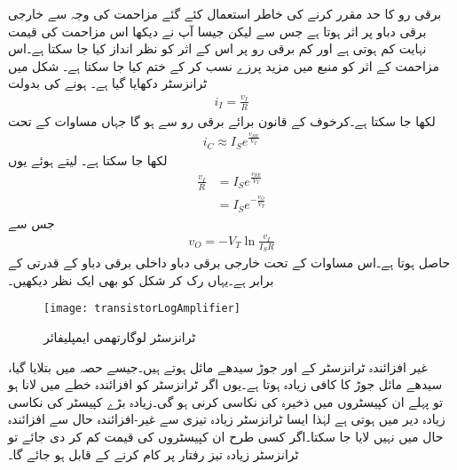 برقی رو کا حد مقرر کرنے کی خاطر استعمال کئے گئے مزاحمت  کی وجہ سے خارجی برقی دباو   پر اثر ہوتا ہے جس سے  لیکن جیسا آپ نے دیکھا اس مزاحمت کی قیمت نہایت کم ہوتی ہے اور کم برقی رو پر اس کے اثر کو نظر انداز کیا جا سکتا ہے۔اس مزاحمت کے اثر کو منبع میں مزید پرزے نسب کر کے ختم کیا جا سکتا ہے۔
شکل  میں ٹرانزسٹر  دکھایا گیا ہے۔ ہونے کی بدولت
\begin{align*}
i_I=\frac{v_I}{R}
\end{align*}
لکھا جا سکتا ہے۔کرخوف کے قانون برائے برقی رو سے  ہو گا جہاں مساوات  کے تحت
\begin{align*}
i_C \approx I_S e^{\frac{v_{BE}}{V_T}}
\end{align*}
لکھا جا سکتا ہے۔ لیتے ہوئے یوں
\begin{align*}
\frac{v_I}{R}&=I_S e^{\frac{v_{BE}}{V_T}}\\
&=I_S e^{-\frac{v_{O}}{V_T}}
\end{align*}
جس سے
\begin{align}
v_O=-V_T \ln \frac{v_I}{I_S R}
\end{align}
حاصل ہوتا ہے۔اس مساوات کے تحت خارجی برقی دباو  داخلی برقی دباو کے قدرتی  کے برابر ہے۔یہاں رک کر شکل  کو بھی ایک نظر دیکھیں۔
%
\begin{figure}
\centering
\texttt{[image: transistorLogAmplifier]}
\caption{ٹرانزسٹر لوگارتھمی ایمپلیفائر}
\label{شکل_ٹرانزسٹر_لوگارتھم_ایمپلیفائر}
\end{figure}
غیر افزائندہ ٹرانزسٹر کے  اور  جوڑ سیدھے مائل ہوتے ہیں۔جیسے حصہ  میں بتلایا گیا، سیدھے مائل  جوڑ کا  کافی زیادہ ہوتا ہے۔یوں اگر ٹرانزسٹر کو افزائندہ خطے میں لانا ہو تو پہلے ان کپیسٹروں میں ذخیرہ  کی نکاسی کرنی ہو گی۔زیادہ بڑے کپیسٹر کی نکاسی زیادہ دیر میں ہوتی ہے لہٰذا ایسا ٹرانزسٹر زیادہ تیزی سے غیر-افزائندہ حال سے افزائندہ حال میں نہیں لایا جا سکتا۔اگر کسی طرح ان کپیسٹروں کی قیمت کم کر دی جائے تو ٹرانزسٹر زیادہ تیز رفتار پر کام کرنے کے قابل ہو جائے گا۔

